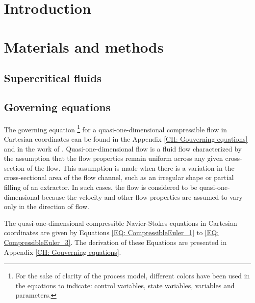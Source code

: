\documentclass[a4paper,fleqn]{cas-dc}
\begin{document}

\section{Introduction}
%


\section{Materials and methods} \label{CH: Materials and methods}

\subsection{Supercritical fluids} \label{CH: Thermodynamic}
%


%

\subsection{Governing equations} \label{CH:Governing_equations_chapter}
The governing equation \footnote{For the sake of clarity of the process model, different colors have been used in the equations to indicate: 
	{\color{red}control variables},
	{\color{blue}state variables},
	{\color{orange}variables} and
	{\color{magenta}parameters}.} for a quasi-one-dimensional compressible flow in Cartesian coordinates can be found in the Appendix \ref{CH: Gouverning equations} and in the work of \citet{Anderson1995}. Quasi-one-dimensional flow is a fluid flow characterized by the assumption that the flow properties remain uniform across any given cross-section of the flow. This assumption is made when there is a variation in the cross-sectional area of the flow channel, such as an irregular shape or partial filling of an extractor. In such cases, the flow is considered to be quasi-one-dimensional because the velocity and other flow properties are assumed to vary only in the direction of flow.

The quasi-one-dimensional compressible Navier-Stokes equations in Cartesian coordinates are given by Equations \ref{EQ: CompressibleEuler_1} to \ref{EQ: CompressibleEuler_3}. The derivation of these Equations are presented in Appendix \ref{CH: Gouverning equations}.
\end{document}
